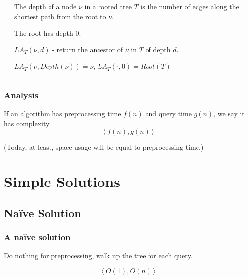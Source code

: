 \documentclass[aspectratio=169]{beamer}
\begin{document}
\begin{frame}
\begin{columns}[onlytextwidth]
\begin{column}{.48\textwidth}
{    }

  \end{column}%
  \hfill%
  \begin{column}{.48\textwidth}

     {

      \begin{definition}[Depth]
        The \alert{depth} of a node $\nu$ in a rooted tree $T$ is the
        number of edges along the shortest path from the root to $\nu$.

        The root has depth $0$.
      \end{definition}

    }

     {

      \begin{definition}
        $LA_T(\nu, d)$ - return the ancestor of $\nu$ in $T$ of depth $d$.

        $LA_T(\nu, Depth(\nu)) = \nu$, $LA_T(\cdot, 0) = Root(T)$
      \end{definition}

    }

  \end{column}%
\end{columns}

\end{frame}

\begin{frame}
\frametitle{Analysis}

If an algorithm has preprocessing time $f(n)$ and query time $g(n)$, we
say it has complexity
\[
\left< f(n), g(n) \right>
\]

\pause

(Today, at least, space usage will be equal to preprocessing time.)

\end{frame}

\section{Simple Solutions}

\subsection{Na\"{i}ve Solution}

\begin{frame}
\frametitle{A na\"{i}ve solution}

Do nothing for preprocessing, walk up the tree for each query.

\pause
\vspace{1em}
\[
\left< O(1), O(n) \right>
\]

\end{frame}
\end{document}
